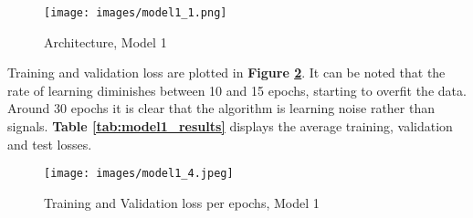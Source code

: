 \documentclass[11pt]{article}
\begin{document}
\begin{table}[H]
    \begin{center}
    \caption{Hyperparameters, Model 1} \label{tab:hyper_model1}
    
    \end{center}
\end{table}

\begin{figure}[H]
    \centering
    \texttt{[image: images/model1\_1.png]}
    \caption{Architecture, Model 1}
    \label{fig:architecture_model1}
\end{figure}

Training and validation loss are plotted in \textbf{Figure \ref{fig:model1_results}}. It can be noted that the rate of learning diminishes between 10 and 15 epochs, starting to overfit the data. Around 30 epochs it is clear that the algorithm is learning noise rather than signals.
\textbf{Table \ref{tab:model1_results}} displays the average training, validation and test losses.\\


\begin{figure}[H]
    \centering
    \texttt{[image: images/model1\_4.jpeg]}
    \caption{Training and Validation loss per epochs, Model 1}
    \label{fig:model1_results}
\end{figure}
\end{document}
